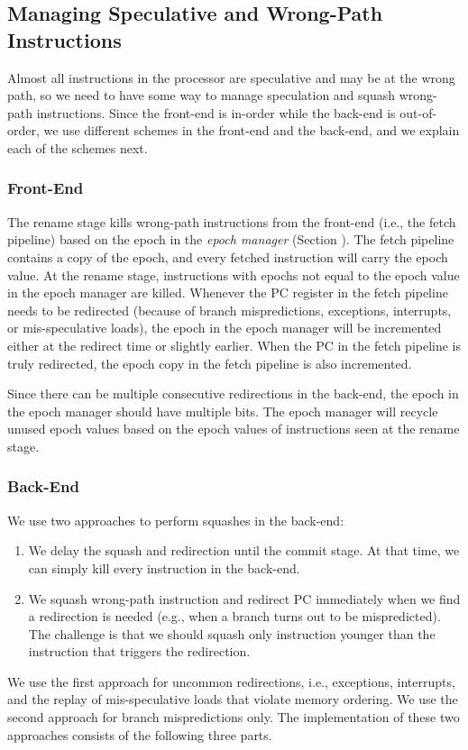 \subsection{Managing Speculative and Wrong-Path Instructions}\label{sec:specupdate}

Almost all instructions in the processor are speculative and may be at the wrong path, so we need to have some way to manage speculation and squash wrong-path instructions.
Since the front-end is in-order while the back-end is out-of-order, we use different schemes in the front-end and the back-end, and we explain each of the schemes next.

\subsubsection{Front-End}
The rename stage kills wrong-path instructions from the front-end (i.e., the fetch pipeline) based on the epoch in the \emph{epoch manager} (Section ).
The fetch pipeline contains a copy of the epoch, and every fetched instruction will carry the epoch value.
At the rename stage, instructions with epochs not equal to the epoch value in the epoch manager are killed.
Whenever the PC register in the fetch pipeline needs to be redirected (because of branch mispredictions, exceptions, interrupts, or mis-speculative loads), the epoch in the epoch manager will be incremented either at the redirect time or slightly earlier.
When the PC in the fetch pipeline is truly redirected, the epoch copy in the fetch pipeline is also incremented.

Since there can be multiple consecutive redirections in the back-end, the epoch in the epoch manager should have multiple bits.
The epoch manager will recycle unused epoch values based on the epoch values of instructions seen at the rename stage.

\subsubsection{Back-End}
We use two approaches to perform squashes in the back-end:
\begin{enumerate}
    \item We delay the squash and redirection until the commit stage.
    At that time, we can simply kill every instruction in the back-end.
    \item We squash wrong-path instruction and redirect PC immediately when we find a redirection is needed (e.g., when a branch turns out to be mispredicted).
    The challenge is that we should squash only instruction younger than the instruction that triggers the redirection.
\end{enumerate}
We use the first approach for uncommon redirections, i.e., exceptions, interrupts, and the replay of mis-speculative loads that violate memory ordering.
We use the second approach for branch mispredictions only.
The implementation of these two approaches consists of the following three parts.

